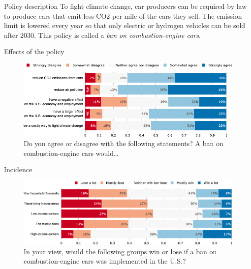 \documentclass[aspectratio=169,9pt,dvipsnames]{beamer}
\begin{document}
\begin{frame}{Policy description}%
To fight climate change, car producers can be required by law to produce cars that emit less CO2 per mile of the cars they sell. The emission limit is lowered every year so that only electric or hydrogen vehicles can be sold after 2030. This policy is called a \textit{ban on combustion-engine cars}. 
\end{frame}


\begin{frame}{Effects of the policy}%

\begin{figure}[h!]
\centering
\caption{Do you agree or disagree with the following statements? A ban on combustion-engine cars would…}
\includegraphics[width=\textwidth]{../figures/US/standard_effect_US.png}
\end{figure}
\end{frame}

\begin{frame}{Incidence}%
\begin{figure}[h!]
\centering
\caption{In your view, would the following groups win or lose if a ban on combustion-engine cars was implemented in the U.S.?}
\includegraphics[width=\textwidth]{../figures/US/standard_win_lose_US.png}
\end{figure}
\end{frame}
\end{document}
